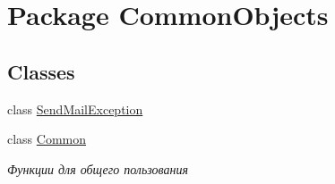 \hypertarget{namespace_common_objects}{
\section{Package CommonObjects}
\label{namespace_common_objects}
}
\subsection*{Classes}
\begin{DoxyCompactItemize}
\item 
class \hyperlink{class_common_objects_1_1_send_mail_exception}{SendMailException}
\item 
class \hyperlink{class_common_objects_1_1_common}{Common}
\begin{DoxyCompactList}\small\item\em Функции для общего пользования \item\end{DoxyCompactList}\end{DoxyCompactItemize}
